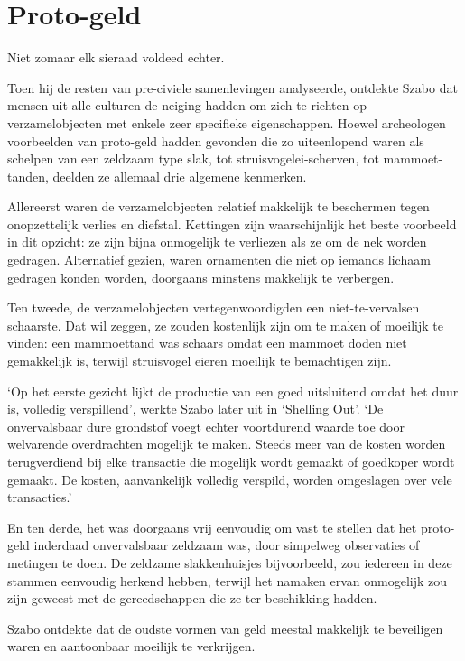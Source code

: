 \documentclass[smalldemyvopaper,11pt,twoside,onecolumn,openright,extrafontsizes,hidelinks]{memoir}
\begin{document}
\section{Proto-geld}\label{proto-geld}

Niet zomaar elk sieraad voldeed echter.

Toen hij de resten van pre-civiele samenlevingen analyseerde, ontdekte
Szabo dat mensen uit alle culturen de neiging hadden om zich te richten
op verzamelobjecten met enkele zeer specifieke eigenschappen. Hoewel
archeologen voorbeelden van proto-geld hadden gevonden die zo
uiteenlopend waren als schelpen van een zeldzaam type slak, tot
struisvogelei-scherven, tot mammoet-tanden, deelden ze allemaal drie
algemene kenmerken.

Allereerst waren de verzamelobjecten relatief makkelijk te beschermen
tegen onopzettelijk verlies en diefstal. Kettingen zijn waarschijnlijk
het beste voorbeeld in dit opzicht: ze zijn bijna onmogelijk te
verliezen als ze om de nek worden gedragen. Alternatief gezien, waren
ornamenten die niet op iemands lichaam gedragen konden worden, doorgaans
minstens makkelijk te verbergen.

Ten tweede, de verzamelobjecten vertegenwoordigden een niet-te-vervalsen
schaarste. Dat wil zeggen, ze zouden kostenlijk zijn om te maken of
moeilijk te vinden: een mammoettand was schaars omdat een mammoet doden
niet gemakkelijk is, terwijl struisvogel eieren moeilijk te bemachtigen
zijn.

`Op het eerste gezicht lijkt de productie van een goed uitsluitend omdat
het duur is, volledig verspillend', werkte Szabo later uit in `Shelling
Out'. `De onvervalsbaar dure grondstof voegt echter voortdurend waarde
toe door welvarende overdrachten mogelijk te maken. Steeds meer van de
kosten worden terugverdiend bij elke transactie die mogelijk wordt
gemaakt of goedkoper wordt gemaakt. De kosten, aanvankelijk volledig
verspild, worden omgeslagen over vele transacties.'

En ten derde, het was doorgaans vrij eenvoudig om vast te stellen dat
het proto-geld inderdaad onvervalsbaar zeldzaam was, door simpelweg
observaties of metingen te doen. De zeldzame slakkenhuisjes
bijvoorbeeld, zou iedereen in deze stammen eenvoudig herkend hebben,
terwijl het namaken ervan onmogelijk zou zijn geweest met de
gereedschappen die ze ter beschikking hadden.

Szabo ontdekte dat de oudste vormen van geld meestal makkelijk te
beveiligen waren en aantoonbaar moeilijk te verkrijgen.
\end{document}
